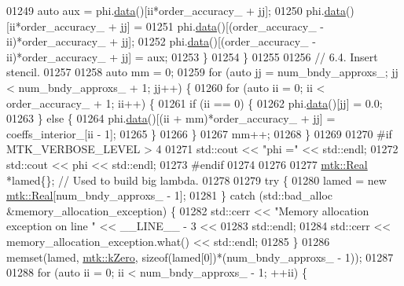 \begin{DoxyCode}
{{01249         \textcolor{keyword}{auto} aux = phi.\hyperlink{classmtk_1_1DenseMatrix_a0c33b8a9e01d157c61ddbdf807c25d84}{data}()[ii*order\_accuracy\_ + jj];
01250         phi.\hyperlink{classmtk_1_1DenseMatrix_a0c33b8a9e01d157c61ddbdf807c25d84}{data}()[ii*order\_accuracy\_ + jj] =
01251           phi.\hyperlink{classmtk_1_1DenseMatrix_a0c33b8a9e01d157c61ddbdf807c25d84}{data}()[(order\_accuracy\_ - ii)*order\_accuracy\_ + jj];
01252         phi.\hyperlink{classmtk_1_1DenseMatrix_a0c33b8a9e01d157c61ddbdf807c25d84}{data}()[(order\_accuracy\_ - ii)*order\_accuracy\_ + jj] = aux;
01253       \}
01254     \}
01255 
01256     \textcolor{comment}{// 6.4. Insert stencil.}
01257 
01258     \textcolor{keyword}{auto} mm = 0;
01259     \textcolor{keywordflow}{for} (\textcolor{keyword}{auto} jj = num\_bndy\_approxs\_; jj < num\_bndy\_approxs\_ +  1; jj++) \{
01260       \textcolor{keywordflow}{for} (\textcolor{keyword}{auto} ii = 0; ii < order\_accuracy\_ + 1; ii++) \{
01261         \textcolor{keywordflow}{if} (ii == 0) \{
01262           phi.\hyperlink{classmtk_1_1DenseMatrix_a0c33b8a9e01d157c61ddbdf807c25d84}{data}()[jj] = 0.0;
01263         \} \textcolor{keywordflow}{else} \{
01264           phi.\hyperlink{classmtk_1_1DenseMatrix_a0c33b8a9e01d157c61ddbdf807c25d84}{data}()[(ii + mm)*order\_accuracy\_ + jj] = coeffs\_interior\_[ii - 1];
01265         \}
01266       \}
01267       mm++;
01268     \}
01269 
01270 \textcolor{preprocessor}{    #if MTK\_VERBOSE\_LEVEL > 4}
01271     std::cout << \textcolor{stringliteral}{"phi ="} << std::endl;
01272     std::cout << phi << std::endl;
01273 \textcolor{preprocessor}{    #endif}
01274 
01276 
01277     \hyperlink{group__c01-roots_gac080bbbf5cbb5502c9f00405f894857d}{mtk::Real} *lamed\{\};  \textcolor{comment}{// Used to build big lambda.}
01278 
01279     \textcolor{keywordflow}{try} \{
01280       lamed = \textcolor{keyword}{new} \hyperlink{group__c01-roots_gac080bbbf5cbb5502c9f00405f894857d}{mtk::Real}[num\_bndy\_approxs\_ - 1];
01281     \} \textcolor{keywordflow}{catch} (std::bad\_alloc &memory\_allocation\_exception) \{
01282       std::cerr << \textcolor{stringliteral}{"Memory allocation exception on line "} << \_\_LINE\_\_ - 3 <<
01283         std::endl;
01284       std::cerr << memory\_allocation\_exception.what() << std::endl;
01285     \}
01286     memset(lamed, \hyperlink{group__c01-roots_ga59a451a5fae30d59649bcda274fea271}{mtk::kZero}, \textcolor{keyword}{sizeof}(lamed[0])*(num\_bndy\_approxs\_ - 1));
01287 
01288     \textcolor{keywordflow}{for} (\textcolor{keyword}{auto} ii = 0; ii < num\_bndy\_approxs\_ - 1; ++ii) \{
}}
\end{DoxyCode}
